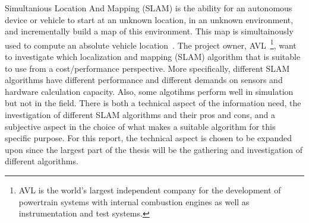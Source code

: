 Simultanious Location And Mapping (SLAM) is the ability for an autonomous
device or vehicle to start at an unknown location, in an unknown environment, and
incrementally build a map of this environment. This map is simultainously used to compute
an absolute vehicle location~\cite{938381}. The project owner, AVL~\footnote{AVL is the world's largest independent company for the development of powertrain systems with internal combustion engines as well as instrumentation and test systems.}, want to investigate which localization and mapping (SLAM) algorithm
that is suitable to use from a cost/performance perspective. More specifically,
different SLAM algorithms have different performance and different demands on
sensors and hardware calculation capacity. Also, some algotihms perform well in
simulation but not in the field.  There is both a technical aspect of the
information need, the investigation of different SLAM algorithms and their pros
and cons, and a subjective aspect in the choice of what makes a suitable
algorithm for this specific purpose. For this report, the technical aspect is
chosen to be expanded upon since the largest part of the thesis will be the
gathering and investigation of different algorithms.
